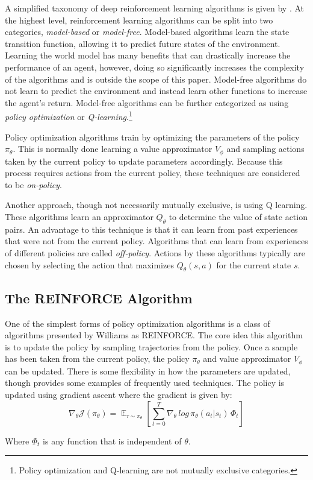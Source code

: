 \documentclass[conference]{IEEEtran}
\begin{document}
A simplified taxonomy of deep reinforcement learning algorithms is given by \cite{spinning_up_taxonomy}. At the highest level, reinforcement learning algorithms can be split into two categories, \textit{model-based} or \textit{model-free}. Model-based algorithms learn the state transition function, allowing it to predict future states of the environment. Learning the world model has many benefits that can drastically increase the performance of an agent, however, doing so significantly increases the complexity of the algorithms and is outside the scope of this paper. Model-free algorithms do not learn to predict the environment and instead learn other functions to increase the agent's return. Model-free algorithms can be further categorized as using \textit{policy optimization} or \textit{Q-learning}.\footnote{Policy optimization and Q-learning are not mutually exclusive categories.}

Policy optimization algorithms train by optimizing the parameters of the policy $\pi_\theta$. This is normally done learning a value approximator $V_\phi$ and sampling actions taken by the current policy to update parameters accordingly. Because this process requires actions from the current policy, these techniques are considered to be \textit{on-policy}.

Another approach, though not necessarily mutually exclusive, is using Q learning. These algorithms learn an approximator $Q_\theta$ to determine the value of state action pairs. An advantage to this technique is that it can learn from past experiences that were not from the current policy. Algorithms that can learn from experiences of different policies are called \textit{off-policy}. Actions by these algorithms typically are chosen by selecting the action that maximizes $Q_\theta(s, a)$ for the current state $s$.

\subsection{The REINFORCE Algorithm}

One of the simplest forms of policy optimization algorithms is a class of algorithms presented by Williams as REINFORCE. \cite{REINFORCE} The core idea this algorithm is to update the policy by sampling trajectories from the policy. Once a sample has been taken from the current policy, the policy $\pi_\theta$ and value approximator $V_\phi$ can be updated. There is some flexibility in how the parameters are updated, though \cite{spinning_up_policy_optimization} provides some examples of frequently used techniques. The policy is updated using gradient ascent where the gradient is given by:
$$
    \nabla_\theta\mathcal{J(\pi_\theta)} = \mathop{\mathbb{E}}_{\tau \sim \pi_\theta} \left[\sum_{t=0}^{T}\nabla_\theta \, log \, \pi_\theta(a_t | s_t) \, \Phi_t \right]
$$
\begin{flushleft}
    Where $\Phi_t$ is any function that is independent of $\theta$.
\end{flushleft}
\end{document}
